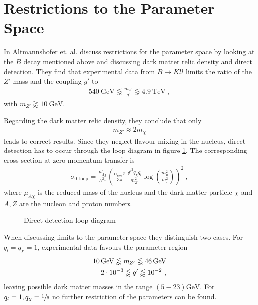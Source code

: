 
\section{Restrictions to the Parameter Space\label{sec:ParamSpace}}
In \cite{Z} Altmannshofer et. al. discuss restrictions for the parameter space by looking at the $B$ decay mentioned above and discussing dark matter relic density and direct detection. They find that experimental data from $B\rightarrow Kl\bar{l}$ limits the ratio of the $Z'$ mass and the coupling $g'$ to
\begin{align}\label{eq:BoundBS}
	\SI{540}{\giga\electronvolt}\lessapprox\frac{m_{Z'}}{g'}\lessapprox\SI{4.9}{\tera\electronvolt} \ ,
\end{align}
with $m_{Z'}\gtrapprox\SI{10}{\giga\electronvolt}$.


Regarding the dark matter relic density, they conclude that only
\begin{align}\label{eq:Relic}
	m_{Z'}\approx 2m_\chi
\end{align}
leads to correct results. Since they neglect flavour mixing in the nucleus, direct detection has to occur through the loop diagram in figure \ref{fig:Loop}. The corresponding cross section at zero momentum transfer is
\begin{align}\label{eq:Loop}
	\sigma_{0,\text{loop}} = \frac{\mu_{A\chi}^2}{A^2\pi}\left(\frac{\alpha_{em}Z}{3\pi}\ \frac{g'^2q_\chi q_l}{m_{Z'}^2}\log\left(\frac{m_\mu^2}{m_\tau^2}\right)\right)^2 \ ,
\end{align}
where $\mu_{A\chi}$ is the reduced mass of the nucleus and the dark matter particle $\chi$ and $A,Z$ are the nucleon and proton numbers.

\begin{figure}[h!]
	\centering
	
	\caption{Direct detection loop diagram}
	\label{fig:Loop}
\end{figure}


When discussing limits to the parameter space they distinguish two cases. For $q_l=q_\chi=1$, experimental data favours the parameter region
\begin{align}\label{eq:Boundg}
	\SI{10}{\giga\electronvolt}\lessapprox m_{Z'}\lessapprox\SI{46}{\giga\electronvolt}\notag \\
	\SI{2e-3}{}\lessapprox g'\lessapprox\SI{e-2}{} \ ,
\end{align}
leaving possible dark matter masses in the range $(5-23)\si{\giga\electronvolt}$. For $q_l=1,q_\chi=\sfrac{1}{6}$ no further restriction of the parameters can be found.


